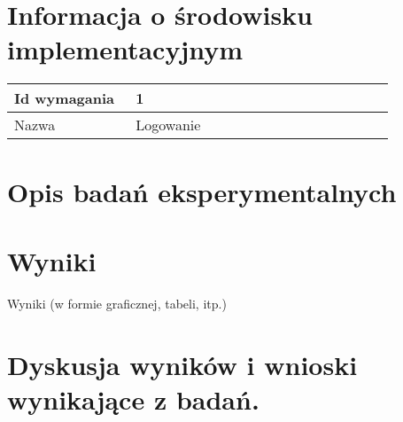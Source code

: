 \documentclass[12pt]{article}
\begin{document}
\section{Informacja o środowisku implementacyjnym}




\begin{table}[H]
	\begin{tabular}{|p{0.3\linewidth}|p{0.64\linewidth}|}%
	\hline
	Id wymagania 	& 1 				\\ \hline
	Nazwa			& Logowanie \\ \hline
	\end{tabular}
\end{table}



\section{Opis badań eksperymentalnych}


\section{Wyniki}
Wyniki (w formie graficznej, tabeli, itp.)




\section{Dyskusja wyników i wnioski wynikające z badań.}
\end{document}
